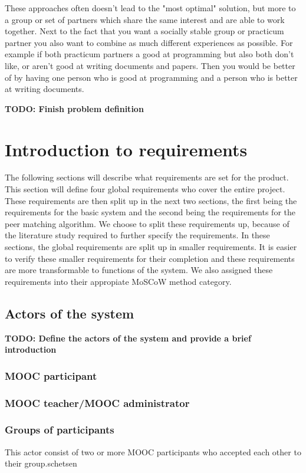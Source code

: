 \documentclass[]{article}
\newcommand{\TODO}[1]{{\color{red}\textbf{TODO: #1}}}
\begin{document}
These approaches often doesn't lead to the "most optimal" solution, but more to a group or set of partners which share the same interest and are able to work together.
Next to the fact that you want a socially stable group or practicum partner you also want to combine as much different experiences as possible.
For example if both practicum partners a good at programming but also both don't like, or aren't good at writing documents and papers.
Then you would be better of by having one person who is good at programming and a person who is better at writing documents.

\TODO{Finish problem definition}

\section{Introduction to requirements}
The following sections will describe what requirements are set for the product.
This section will define four global requirements who cover the entire project.
These requirements are then split up in the next two sections, the first being the requirements for the basic system and the second being the requirements for the peer matching algorithm.
We choose to split these requirements up, because of the literature study required to further specify the requirements.
In these sections, the global requirements are split up in smaller requirements.
It is easier to verify these smaller requirements for their completion and these requirements are more transformable to functions of the system.
We also assigned these requirements into their appropiate MoSCoW \cite{highsmith2001agile} method category.

\subsection{Actors of the system}
\TODO{Define the actors of the system and provide a brief introduction}
\subsubsection{MOOC participant}
\subsubsection{MOOC teacher/MOOC administrator} 
\subsubsection{Groups of participants}
This actor consist of two or more MOOC participants who accepted each other to their group.schetsen
\end{document}
